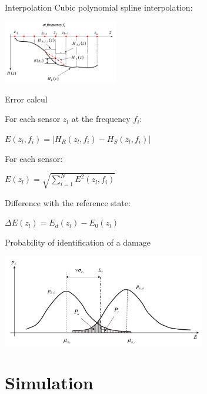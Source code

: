 \documentclass{beamer}
\begin{document}
\begin{frame}{Interpolation}
Cubic polynomial spline interpolation:

\begin{center}
\includegraphics[width=5cm]{images/interpolation.png}
\end{center}

\end{frame}


\begin{frame}{Error calcul}

For each sensor $z_l$ at the frequency $f_i$:
\begin{center}
$E(z_l,f_i) = | H_R(z_l,f_i) - H_S(z_l,f_i) |$
\end{center}


For each sensor:
\begin{center}
$E(z_l) = \sqrt{  \sum\limits_{i=1}^N  E^2(z_l,f_i) }$
\end{center}


Difference with the reference state:
\begin{center}
$\Delta E(z_l) = E_d(z_l) - E_0(z_l)$
\end{center}

\end{frame}

\begin{frame}{Probability of identification of a damage}
\begin{center}
\includegraphics[height=4cm]{images/gaussiennes.png}
\end{center}
\end{frame}


\section{Simulation}
\end{document}
